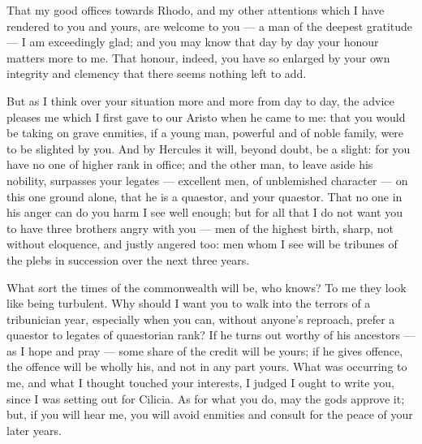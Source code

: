 

 That my good offices towards Rhodo, and my other attentions which I have rendered to you and yours, are welcome to you --- a man of the deepest gratitude --- I am exceedingly glad; and you may know that day by day your honour matters more to me. That honour, indeed, you have so enlarged by your own integrity and clemency that there seems nothing left to add.

 But as I think over your situation more and more from day to day, the advice pleases me which I first gave to our Aristo when he came to me: that you would be taking on grave enmities, if a young man, powerful and of noble family, were to be slighted by you. And by Hercules it will, beyond doubt, be a slight: for you have no one of higher rank in office; and the other man, to leave aside his nobility, surpasses your legates --- excellent men, of unblemished character --- on this one ground alone, that he is a quaestor, and your quaestor. That no one in his anger can do you harm I see well enough; but for all that I do not want you to have three brothers angry with you --- men of the highest birth, sharp, not without eloquence, and justly angered too: men whom I see will be tribunes of the plebs in succession over the next three years.

 What sort the times of the commonwealth will be, who knows? To me they look like being turbulent. Why should I want you to walk into the terrors of a tribunician year, especially when you can, without anyone's reproach, prefer a quaestor to legates of quaestorian rank? If he turns out worthy of his ancestors --- as I hope and pray --- some share of the credit will be yours; if he gives offence, the offence will be wholly his, and not in any part yours. What was occurring to me, and what I thought touched your interests, I judged I ought to write you, since I was setting out for Cilicia. As for what you do, may the gods approve it; but, if you will hear me, you will avoid enmities and consult for the peace of your later years.

